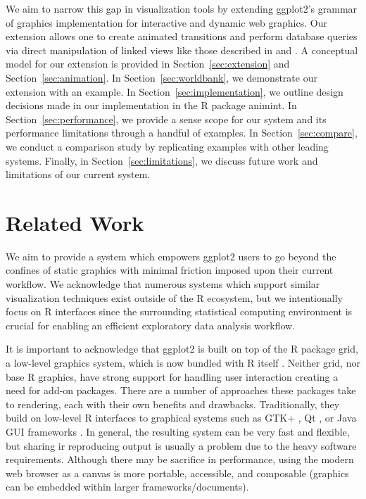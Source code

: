 \documentclass[12pt]{article}\usepackage[]{graphicx}\usepackage[]{color}
\begin{document}
We aim to narrow this gap in visualization tools by extending ggplot2's grammar 
of graphics implementation for interactive and dynamic web graphics. Our 
extension allows one to create animated transitions
and perform database queries via direct manipulation of linked views like those
described in \citep{Ahlberg:1991} and \citep{Buja:1991vh}. 
A conceptual model for our extension is provided in
Section~\ref{sec:extension} and Section~\ref{sec:animation}. In 
Section~\ref{sec:worldbank}, we demonstrate our extension with an example. 
In Section~\ref{sec:implementation}, we outline design decisions made in our
implementation in the R package animint. In Section~\ref{sec:performance}, we
provide a sense scope for our system and its performance limitations through a
handful of examples. In Section~\ref{sec:compare}, we conduct a comparison
study by replicating examples with other leading systems. Finally, in 
Section~\ref{sec:limitations}, we discuss future work and limitations of
our current system.

\section{Related Work}

We aim to provide a system which empowers ggplot2 users to go beyond the 
confines of static graphics with minimal friction imposed upon their current
workflow. We acknowledge that numerous systems which support similar 
visualization techniques exist outside of the R ecosystem, but we 
intentionally focus on R interfaces since the surrounding statistical 
computing environment is crucial for enabling an efficient exploratory data 
analysis workflow.

It is important to acknowledge that ggplot2 is built on top of the R package 
grid, a low-level graphics system, which is now bundled with R itself 
\citep{RCore}. Neither grid, nor base R graphics, have strong support for 
handling user interaction creating a need for add-on packages. There are a 
number of approaches these packages take to rendering, each with their own 
benefits and drawbacks. Traditionally, they build on low-level R interfaces 
to graphical systems such as GTK+ \citep{RGtk2}, Qt \citep{qtbase, qtpaint}, 
or Java GUI frameworks \citep{rJava}. In general, the resulting system can be 
very fast and flexible, but sharing ir reproducing output is usually a problem 
due to the heavy software requirements. Although there may be sacrifice in
performance, using the modern web browser as a canvas is more portable, 
accessible, and composable (graphics can be embedded within larger 
frameworks/documents).
\end{document}

